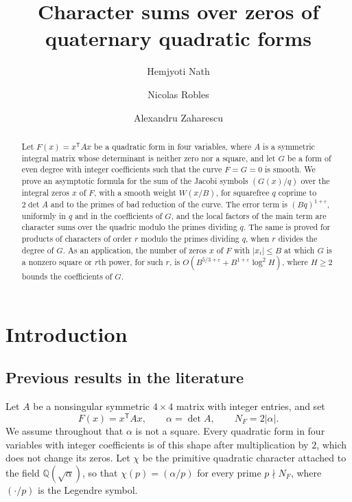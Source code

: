 \documentclass[11pt]{amsart}
\title[Character sums over zeros of quadratic forms]{Character sums over zeros of quaternary quadratic forms}
\author[H.~Nath]{Hemjyoti Nath}
\author[N.~Robles]{Nicolas Robles}
\author[A.~Zaharescu]{Alexandru Zaharescu}
\numberwithin{equation}{section}
\numberwithin{figure}{section}
\theoremstyle{definition}
\newcommand{\Q}{\mathbb{Q}}
\newcommand{\abs}[1]{\lvert #1\rvert}
\begin{document}
\begin{abstract}
Let $F(x)=x^{\mathsf T}Ax$ be a quadratic form in four variables,
where $A$ is a symmetric integral matrix whose determinant is neither
zero nor a square, and let $G$ be a form of even degree with integer
coefficients such that the curve $F=G=0$ is smooth. We
prove an asymptotic formula for the sum of the Jacobi symbols
$(G(x)/q)$ over the integral zeros $x$ of $F$, with a smooth weight
$W(x/B)$, for squarefree $q$ coprime to $2\det A$ and to the primes of
bad reduction of the curve. The error term is
$(Bq)^{1+\varepsilon}$, uniformly in $q$ and in the coefficients of
$G$, and the local factors of the main term are character sums over
the quadric modulo the primes dividing $q$. The same is proved for
products of characters of order $r$ modulo the primes dividing $q$,
when $r$ divides the degree of $G$. As an
application, the number of zeros $x$ of $F$ with $\lvert x_i\rvert\le B$
at which $G$ is a nonzero square or $r$th power, for such $r$, is $O(B^{5/3+\varepsilon}+B^{1+\varepsilon}\log^2H)$, where
$H\ge2$ bounds the coefficients of $G$.
\end{abstract}

\maketitle

\section{Introduction}\label{sec:intro}

\subsection{Previous results in the literature}\label{sec:literature}

Let $A$ be a nonsingular symmetric $4\times4$ matrix with integer
entries, and set
\begin{equation}\label{eq:forms}
 F(x)=x^{\mathsf T}Ax,\qquad \alpha=\det A,\qquad N_F=2\abs{\alpha}.
\end{equation}
We assume throughout that $\alpha$ is not a square. Every quadratic
form in four variables with integer coefficients is of this shape
after multiplication by $2$, which does not change its zeros. Let
$\chi$ be the primitive quadratic character attached to the field
$\Q(\sqrt\alpha)$, so that $\chi(p)=(\alpha/p)$ for every prime
$p\nmid N_F$, where $(\cdot/p)$ is the Legendre symbol.
\end{document}
